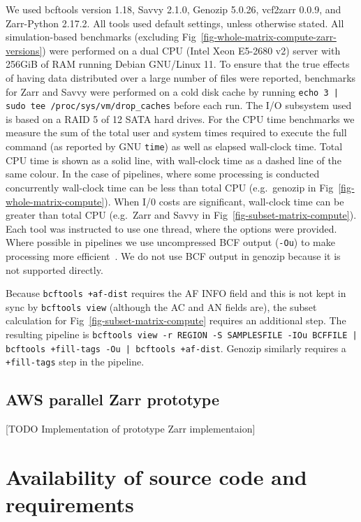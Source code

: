 \documentclass[a4paper,num-refs]{oup-contemporary}
\begin{document}
We used bcftools version 1.18, Savvy 2.1.0, Genozip 5.0.26,
vcf2zarr 0.0.9, and Zarr-Python 2.17.2.
All tools used default settings,
unless otherwise stated.
All simulation-based benchmarks (excluding Fig~\ref{fig-whole-matrix-compute-zarr-versions}) were performed on a
dual CPU (Intel Xeon E5-2680 v2)
server with 256GiB of RAM running Debian GNU/Linux 11.
To ensure that the true effects of having data distributed over a large
number of files were reported, benchmarks for Zarr and Savvy were
performed on a cold disk cache by running
\texttt{echo 3 | sudo tee /proc/sys/vm/drop\_caches} before each run.
The I/O subsystem used is based on a RAID 5 of 12 SATA hard drives.
For the CPU time benchmarks we measure the sum of the total user and
system times required to execute the full command (as reported by GNU
\texttt{time}) as well as elapsed wall-clock time. Total CPU
time is shown as a solid line, with wall-clock time as a dashed line
of the same colour. In the case of pipelines, where some processing
is conducted concurrently wall-clock time can be less than total
CPU (e.g.\ genozip in Fig~\ref{fig-whole-matrix-compute}).
When I/0 costs are significant, wall-clock time can be greater
than total CPU (e.g.\ Zarr and Savvy in Fig~\ref{fig-subset-matrix-compute}).
Each tool was instructed to use one thread, where the options
were provided.
Where possible in pipelines we use uncompressed BCF
output (\texttt{-Ou}) to make processing
more efficient~\citep{danecek2021twelve}.
We do not use BCF output in genozip because it is not supported
directly.

Because \texttt{bcftools +af-dist} requires the AF INFO field
and this is not kept in sync by \texttt{bcftools view}
(although the AC and AN fields are), the subset calculation
for Fig~\ref{fig-subset-matrix-compute} requires an additional step.
The resulting pipeline is
\texttt{bcftools view -r REGION -S SAMPLESFILE -IOu BCFFILE |
bcftools +fill-tags -Ou | bcftools +af-dist}. Genozip similarly
requires a \texttt{+fill-tags} step in the pipeline.

\subsection{AWS parallel Zarr prototype}
[TODO Implementation of prototype Zarr implementaion]

\section{Availability of source code and requirements}
\end{document}

